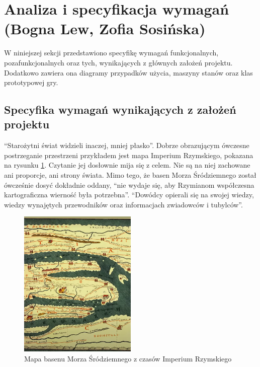 \section{Analiza i specyfikacja wymagań (Bogna Lew, Zofia Sosińska)}\label{s:wymagania}
W niniejszej sekcji przedstawiono specyfikę wymagań funkcjonalnych, pozafunkcjonalnych oraz tych, wynikających z
głównych założeń projektu. Dodatkowo zawiera ona diagramy przypadków użycia, maszyny stanów oraz klas prototypowej gry.

\subsection{Specyfika wymagań wynikających z założeń projektu}
“Starożytni świat widzieli inaczej, mniej płasko”\cite{gbobrektvgry}. Dobrze obrazującym ówczesne postrzeganie
przestrzeni przykładem jest mapa Imperium Rzymskiego, pokazana na rysunku \ref{fig:mapaIR}. Czytanie jej dosłownie mija się z
celem. Nie są na niej zachowane ani proporcje, ani strony świata. Mimo tego, że basen Morza Śródziemnego został
ówcześnie dosyć dokładnie oddany, “nie wydaje się, aby Rzymianom współczesna kartograficzna wierność była potrzebna”\cite{gbobrektvgry}.
“Dowódcy opierali się na swojej wiedzy, wiedzy wynajętych przewodników oraz informacjach zwiadowców i tubylców”\cite{gbobrektvgry}.

\begin{figure}[htbp]
    \centering
    \includegraphics[width=0.5\textwidth]{images/mapaIR.png}
    \caption{Mapa basenu Morza Śródziemnego z czasów Imperium Rzymskiego}\label{fig:mapaIR}
\end{figure}


